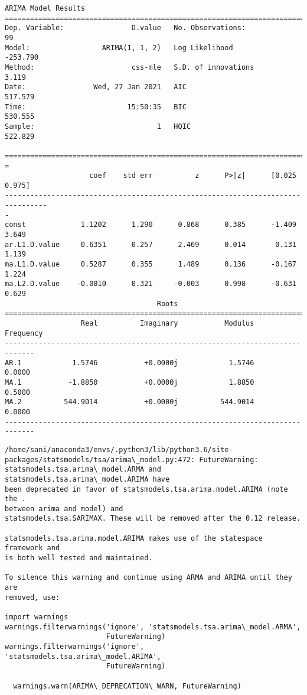 \documentclass[11pt]{article}
\begin{document}
    \begin{Verbatim}[commandchars=\\\{\}]
                             ARIMA Model Results
==============================================================================
Dep. Variable:                D.value   No. Observations:                   99
Model:                 ARIMA(1, 1, 2)   Log Likelihood                -253.790
Method:                       css-mle   S.D. of innovations              3.119
Date:                Wed, 27 Jan 2021   AIC                            517.579
Time:                        15:50:35   BIC                            530.555
Sample:                             1   HQIC                           522.829

================================================================================
=
                    coef    std err          z      P>|z|      [0.025
0.975]
--------------------------------------------------------------------------------
-
const             1.1202      1.290      0.868      0.385      -1.409
3.649
ar.L1.D.value     0.6351      0.257      2.469      0.014       0.131
1.139
ma.L1.D.value     0.5287      0.355      1.489      0.136      -0.167
1.224
ma.L2.D.value    -0.0010      0.321     -0.003      0.998      -0.631
0.629
                                    Roots
=============================================================================
                  Real          Imaginary           Modulus         Frequency
-----------------------------------------------------------------------------
AR.1            1.5746           +0.0000j            1.5746            0.0000
MA.1           -1.8850           +0.0000j            1.8850            0.5000
MA.2          544.9014           +0.0000j          544.9014            0.0000
-----------------------------------------------------------------------------
    \end{Verbatim}

    \begin{Verbatim}[commandchars=\\\{\}]
/home/sani/anaconda3/envs/.python3/lib/python3.6/site-
packages/statsmodels/tsa/arima\_model.py:472: FutureWarning:
statsmodels.tsa.arima\_model.ARMA and statsmodels.tsa.arima\_model.ARIMA have
been deprecated in favor of statsmodels.tsa.arima.model.ARIMA (note the .
between arima and model) and
statsmodels.tsa.SARIMAX. These will be removed after the 0.12 release.

statsmodels.tsa.arima.model.ARIMA makes use of the statespace framework and
is both well tested and maintained.

To silence this warning and continue using ARMA and ARIMA until they are
removed, use:

import warnings
warnings.filterwarnings('ignore', 'statsmodels.tsa.arima\_model.ARMA',
                        FutureWarning)
warnings.filterwarnings('ignore', 'statsmodels.tsa.arima\_model.ARIMA',
                        FutureWarning)

  warnings.warn(ARIMA\_DEPRECATION\_WARN, FutureWarning)
    \end{Verbatim}
\end{document}
